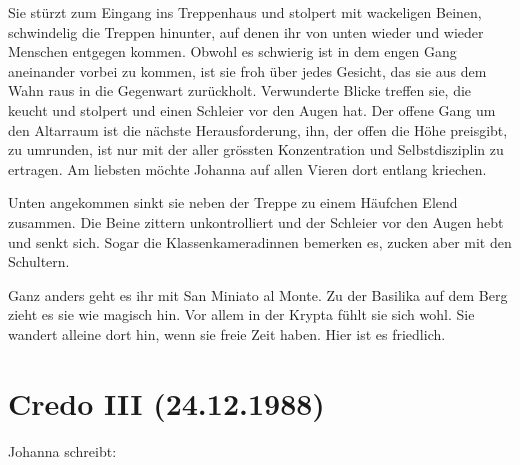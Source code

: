 \documentclass[10pt,a5paper]{book}
\begin{document}
Sie stürzt zum Eingang ins Treppenhaus und stolpert mit wackeligen Beinen, schwindelig die Treppen hinunter, auf denen ihr von unten wieder und wieder Menschen entgegen kommen. Obwohl es schwierig ist in dem engen Gang aneinander vorbei zu kommen, ist sie froh über jedes Gesicht, das sie aus dem Wahn raus in die Gegenwart zurückholt. Verwunderte Blicke treffen sie, die keucht und stolpert und einen Schleier vor den Augen hat. Der offene Gang um den Altarraum ist die nächste Herausforderung, ihn, der offen die Höhe preisgibt, zu umrunden, ist nur mit der aller grössten Konzentration und Selbstdisziplin zu ertragen. Am liebsten möchte Johanna auf allen Vieren  dort entlang kriechen.

Unten angekommen sinkt sie neben der Treppe zu einem Häufchen Elend zusammen. Die Beine zittern unkontrolliert und der Schleier vor den Augen hebt und senkt sich. Sogar die Klassenkameradinnen bemerken es, zucken aber mit den Schultern.

Ganz anders geht es ihr mit San Miniato al Monte. Zu der Basilika auf dem Berg zieht es sie wie magisch hin. Vor allem in der Krypta fühlt sie sich wohl. Sie wandert alleine dort hin, wenn sie freie Zeit haben. Hier ist es friedlich.



\section*{Credo III (24.12.1988)}

Johanna schreibt:
\end{document}
